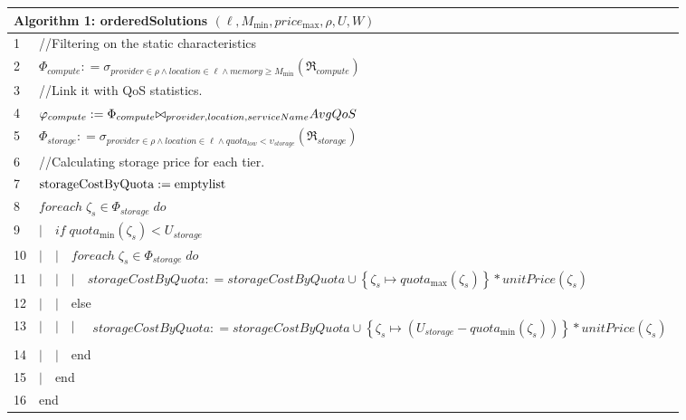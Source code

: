 \documentclass[journal]{IEEEtran}
\begin{document}
\begin{table*}[!ht]
\begin{center}
\begin{tabular}{l l l l l}
\multicolumn{5}{l}{ Algorithm 1: orderedSolutions $( \ell , {M_{\min }} , price_{\max} , \rho , U , W )$ } \\
\hline  
1 & \multicolumn{4}{l}{//Filtering on the static characteristics}\\
2 & \multicolumn{4}{l}{${\Phi _{compute}}: = {\sigma _{provider \in \rho  \wedge location \in \ell  \wedge memory \ge {M_{\min }}}}\left( {{\Re _{compute}}} \right)$}\\

3 & \multicolumn{4}{l}{//Link it with QoS statistics.}\\
4 & \multicolumn{4}{l}{${\varphi _{compute}}: = {\Phi _{compute}}{{\rm \bowtie}_{provider,location,serviceName}}AvgQoS$}\\

5 & \multicolumn{4}{l}{${\Phi _{storage}}: = {\sigma _{provider \in \rho  \wedge location \in \ell  \wedge quot{a_{low}} < {\upsilon _{storage}}}}\left( {{\Re _{storage}}} \right)$}\\

6 & \multicolumn{4}{l}{//Calculating storage price for each tier.}\\
7 & \multicolumn{4}{l}{${\rm{storageCostByQuota: = emptylist}}$}\\
8 & \multicolumn{4}{l}{$foreach\;{\zeta_s} \in {\Phi _{storage}}\;do$}\\
9 & $|$ & \multicolumn{3}{l}{$if\;quot{a_{\min }}({\zeta_s}) < {U_{storage}}$}\\
10 & $|$ & $|$ & \multicolumn{2}{l}{$foreach\;{\zeta_s} \in {\Phi _{storage}}\;do$}\\
11 & $|$ & $|$ & $|$ & \multicolumn{1}{l}{$
storageCostByQuota: = storageCostByQuota \cup \left\{ {{\zeta_s} \mapsto quot{a_{\max }}({\zeta_s})} \right\}* unitPrice({\zeta_s})$}\\
12 & $|$ & $|$ & \multicolumn{2}{l}{else}\\
13 & $|$ & $|$ & $|$ & \multicolumn{1}{l}{$\begin{array}{l}
storageCostByQuota: = storageCostByQuota \cup \left\{ {{\zeta_s} \mapsto \left( {{U_{storage}} - quot{a_{\min }}({\zeta_s})} \right)} \right\}*unitPrice({\zeta_s})
\end{array}$}\\

14 & $|$ & $|$ & \multicolumn{2}{l}{end}\\
15 & $|$ & \multicolumn{2}{l}{end}\\
16 & \multicolumn{4}{l}{end}\\


\end{tabular}
\end{center}
\end{table*}
\end{document}

